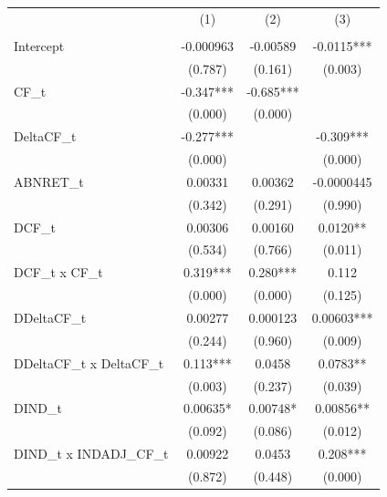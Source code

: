{
\def\sym#1{\ifmmode^{#1}\else\(^{#1}\)\fi}
\begin{tabular}{l*{3}{c}}
\hline\hline
                    &\multicolumn{1}{c}{(1)}&\multicolumn{1}{c}{(2)}&\multicolumn{1}{c}{(3)}\\
                    &\multicolumn{1}{c}{}&\multicolumn{1}{c}{}&\multicolumn{1}{c}{}\\
\hline
Intercept           &   -0.000963   &    -0.00589   &     -0.0115***\\
                    &     (0.787)   &     (0.161)   &     (0.003)   \\
[1em]
CF\_t                &      -0.347***&      -0.685***&               \\
                    &     (0.000)   &     (0.000)   &               \\
[1em]
DeltaCF\_t           &      -0.277***&               &      -0.309***\\
                    &     (0.000)   &               &     (0.000)   \\
[1em]
ABNRET\_t            &     0.00331   &     0.00362   &  -0.0000445   \\
                    &     (0.342)   &     (0.291)   &     (0.990)   \\
[1em]
DCF\_t               &     0.00306   &     0.00160   &      0.0120** \\
                    &     (0.534)   &     (0.766)   &     (0.011)   \\
[1em]
DCF\_t x CF\_t        &       0.319***&       0.280***&       0.112   \\
                    &     (0.000)   &     (0.000)   &     (0.125)   \\
[1em]
DDeltaCF\_t          &     0.00277   &    0.000123   &     0.00603***\\
                    &     (0.244)   &     (0.960)   &     (0.009)   \\
[1em]
DDeltaCF\_t x DeltaCF\_t&       0.113***&      0.0458   &      0.0783** \\
                    &     (0.003)   &     (0.237)   &     (0.039)   \\
[1em]
DIND\_t              &     0.00635*  &     0.00748*  &     0.00856** \\
                    &     (0.092)   &     (0.086)   &     (0.012)   \\
[1em]
DIND\_t x INDADJ\_CF\_t&     0.00922   &      0.0453   &       0.208***\\
                    &     (0.872)   &     (0.448)   &     (0.000)   \\

\end{tabular}}
